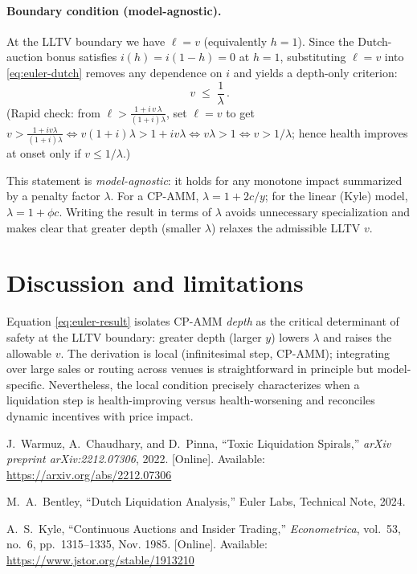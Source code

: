 \documentclass[11pt]{article}
\begin{document}
\paragraph{Boundary condition (model-agnostic).}
At the LLTV boundary we have $\ell = v$ (equivalently $h=1$). Since the Dutch-auction bonus satisfies $i(h)=i(1-h)=0$ at $h=1$, substituting $\ell=v$ into \eqref{eq:euler-dutch} removes any dependence on $i$ and yields a depth-only criterion:
\begin{equation}
\boxed{\, v \;\le\; \frac{1}{\lambda}\,}.
\label{eq:euler-result}
\end{equation}
(Rapid check: from $\ell > \frac{1+i\,v\,\lambda}{(1+i)\lambda}$, set $\ell=v$ to get $v>\frac{1+i v\lambda}{(1+i)\lambda}
\iff v(1+i)\lambda>1+i v\lambda \iff v\lambda>1 \iff v>1/\lambda$; hence health improves at onset only if $v\le 1/\lambda$.)

\noindent
This statement is \emph{model-agnostic}: it holds for any monotone impact summarized by a penalty factor $\lambda$. For a CP-AMM, $\lambda=1+2c/y$; for the linear (Kyle) model, $\lambda=1+\phi c$. Writing the result in terms of $\lambda$ avoids unnecessary specialization and makes clear that greater depth (smaller $\lambda$) relaxes the admissible LLTV $v$.


\section{Discussion and limitations}
Equation \eqref{eq:euler-result} isolates CP-AMM \emph{depth} as the critical determinant of safety at the LLTV boundary: greater depth (larger \(y\)) lowers \(\lambda\) and raises the allowable \(v\). The derivation is local (infinitesimal step, CP-AMM); integrating over large sales or routing across venues is straightforward in principle but model-specific. Nevertheless, the local condition precisely characterizes when a liquidation step is health-improving versus health-worsening and reconciles dynamic incentives with price impact.

\bigskip
\begin{thebibliography}{99}

J.~Warmuz, A.~Chaudhary, and D.~Pinna, 
``Toxic Liquidation Spirals,'' 
\emph{arXiv preprint arXiv:2212.07306}, 2022. [Online]. Available: \url{https://arxiv.org/abs/2212.07306}

M.~A.~Bentley, 
``Dutch Liquidation Analysis,'' 
Euler Labs, Technical Note, 2024.

A.~S.~Kyle, 
``Continuous Auctions and Insider Trading,'' 
\emph{Econometrica}, vol.~53, no.~6, pp.~1315--1335, Nov. 1985. [Online]. Available: \url{https://www.jstor.org/stable/1913210}

\end{thebibliography}
\end{document}
